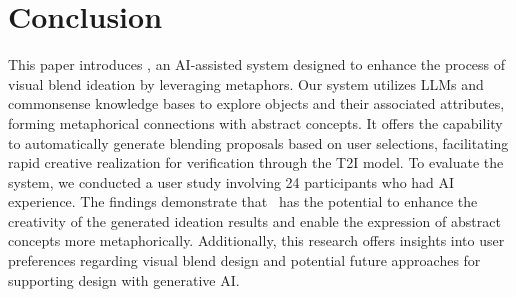 \section{Conclusion}



This paper introduces \sysname, an AI-assisted system designed to enhance the process of visual blend ideation by leveraging metaphors. 
Our system utilizes LLMs and commonsense knowledge bases to explore objects and their associated attributes, forming metaphorical connections with abstract concepts. 
It offers the capability to automatically generate blending proposals based on user selections, facilitating rapid creative realization for verification through the T2I model.
To evaluate the system, we conducted a user study involving 24 participants who had AI experience. The findings demonstrate that \sysname\ has the potential to enhance the creativity of the generated ideation results and enable the expression of abstract concepts more metaphorically.
Additionally, this research offers insights into user preferences regarding visual blend design and potential future approaches for supporting design with generative AI.

